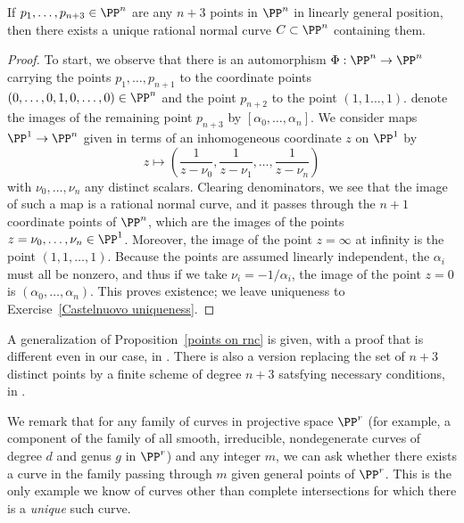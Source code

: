 \begin{proposition}\label{points on rnc}
If $p_1,\dots, p_{n+3} \in \PP^n$ are any $n+3$ points in $\PP^n$ in linearly general position, then there exists a unique rational normal curve $C \subset \PP^n$ containing them.
 \end{proposition}

\begin{proof}
To start, we observe that there is an automorphism $\Phi : \PP^n \to \PP^n$ carrying the points $p_1,\dots,p_{n+1}$ to the coordinate points $(0,\dots,0,1,0,\dots,0)\in \PP^n$ and the point $p_{n+2}$ to the point $(1,1\dots,1)$.  denote the images of the remaining  point $p_{n+3}$  by $[\alpha_0,\dots,\alpha_n]$. We consider maps $\PP^1 \to \PP^n$ given in terms of an inhomogeneous coordinate $z$ on $\PP^1$ by
$$
z \mapsto \left( \frac{1}{z - \nu_0}, \frac{1}{z - \nu_1} , \dots, \frac{1}{z - \nu_n}  \right)
$$
with $\nu_0,\dots,\nu_n$ any distinct scalars. Clearing denominators, we see that the image of such a map is a rational normal curve, and it passes through the $n+1$ coordinate points of $\PP^n$, which are the images of the points $z = \nu_0, \dots, \nu_n \in \PP^1$. Moreover, the image of the point $z = \infty$ at infinity is the point $(1,1, \dots,1)$. Because the points are assumed linearly independent, the $\alpha_i$ must all be nonzero, and thus if we take  $\nu_i = -1/\alpha_i$, the image of the point $z = 0$ is $(\alpha_0,\dots,\alpha_n)$. This proves existence; we leave uniqueness to Exercise~\ref{Castelnuovo uniqueness}. 
\end{proof}

\begin{fact}
A generalization of Proposition~\ref{points on rnc} is given, with a proof that is different
even in our case, in \cite[Proposition 3.19]{Montreal}.  There is also a version replacing the set of $n+3$ distinct points by a  finite
scheme of degree $n+3$ satsfying necessary conditions, in \cite{EHLGP}.
\end{fact}

We remark that for any family of curves in projective space $\PP^r$ (for example, a component of the family of all smooth, irreducible, nondegenerate curves of degree $d$ and genus $g$ in $\PP^r$) and any integer $m$, we can ask whether there exists a curve in the family passing through $m$ given general points of $\PP^r$. This is the only example we know of curves other than complete intersections for which there is a \emph{unique} such curve.


